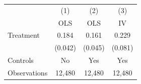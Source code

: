 \begin{tabular}{lccc}
  \toprule
  {}                 & (1)     & (2)     & (3)     \\
  {}                 & OLS     & OLS     & IV      \\
  \midrule
  Treatment          & 0.184   & 0.161   & 0.229   \\
                     & (0.042) & (0.045) & (0.081) \\
  Controls           & No      & Yes     & Yes     \\
  \midrule
  Observations       & 12,480  & 12,480  & 12,480  \\
  \bottomrule
\end{tabular}
